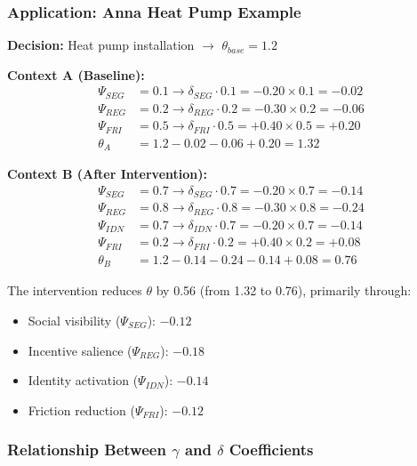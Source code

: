 \subsubsection{Application: Anna Heat Pump Example}

\textbf{Decision:} Heat pump installation $\rightarrow$ $\theta_{base} = 1.2$

\textbf{Context A (Baseline):}
\begin{align*}
\Psi_{SEG} &= 0.1 \rightarrow \delta_{SEG} \cdot 0.1 = -0.20 \times 0.1 = -0.02 \\
\Psi_{REG} &= 0.2 \rightarrow \delta_{REG} \cdot 0.2 = -0.30 \times 0.2 = -0.06 \\
\Psi_{FRI} &= 0.5 \rightarrow \delta_{FRI} \cdot 0.5 = +0.40 \times 0.5 = +0.20 \\
\theta_A &= 1.2 - 0.02 - 0.06 + 0.20 = \mathbf{1.32}
\end{align*}

\textbf{Context B (After Intervention):}
\begin{align*}
\Psi_{SEG} &= 0.7 \rightarrow \delta_{SEG} \cdot 0.7 = -0.20 \times 0.7 = -0.14 \\
\Psi_{REG} &= 0.8 \rightarrow \delta_{REG} \cdot 0.8 = -0.30 \times 0.8 = -0.24 \\
\Psi_{IDN} &= 0.7 \rightarrow \delta_{IDN} \cdot 0.7 = -0.20 \times 0.7 = -0.14 \\
\Psi_{FRI} &= 0.2 \rightarrow \delta_{FRI} \cdot 0.2 = +0.40 \times 0.2 = +0.08 \\
\theta_B &= 1.2 - 0.14 - 0.24 - 0.14 + 0.08 = \mathbf{0.76}
\end{align*}

The intervention reduces $\theta$ by 0.56 (from 1.32 to 0.76), primarily through:
\begin{itemize}
\item Social visibility ($\Psi_{SEG}$): $-0.12$
\item Incentive salience ($\Psi_{REG}$): $-0.18$
\item Identity activation ($\Psi_{IDN}$): $-0.14$
\item Friction reduction ($\Psi_{FRI}$): $-0.12$
\end{itemize}

\subsubsection{Relationship Between $\gamma$ and $\delta$ Coefficients}

